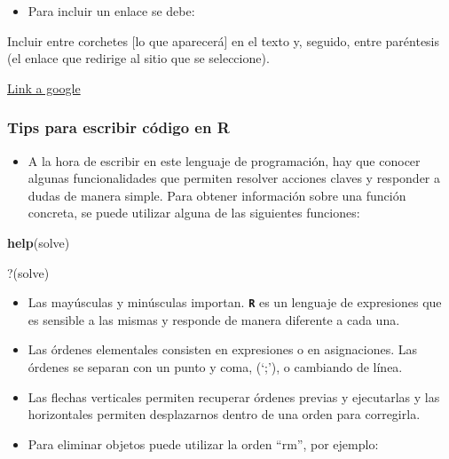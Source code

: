 \documentclass[
]{article}
\newenvironment{Shaded}{\begin{snugshade}}{\end{snugshade}}
\newcommand{\AttributeTok}[1]{\textcolor[rgb]{0.13,0.29,0.53}{#1}}
\newcommand{\FunctionTok}[1]{\textcolor[rgb]{0.13,0.29,0.53}{\textbf{#1}}}
\newcommand{\NormalTok}[1]{#1}
\newcommand{\StringTok}[1]{\textcolor[rgb]{0.31,0.60,0.02}{#1}}
\providecommand{\tightlist}{%
  \setlength{\itemsep}{0pt}\setlength{\parskip}{0pt}}
\begin{document}
\begin{itemize}
\tightlist
\item
  Para incluir un enlace se debe:
\end{itemize}

\begin{Shaded}
\begin{Highlighting}[]
\NormalTok{Incluir entre corchetes [lo que aparecerá] en el texto y, seguido, entre paréntesis (el enlace que redirige al sitio que se seleccione).}
\end{Highlighting}
\end{Shaded}

\href{www.google.com.ar}{Link a google}

\hypertarget{tips-para-escribir-cuxf3digo-en-r}{%
\subsubsection{Tips para escribir código en R}\label{tips-para-escribir-cuxf3digo-en-r}}

\begin{itemize}
\tightlist
\item
  A la hora de escribir en este lenguaje de programación, hay que conocer algunas funcionalidades que permiten resolver acciones claves y responder a dudas de manera simple. Para obtener información sobre una función concreta, se puede utilizar alguna de las siguientes funciones:
\end{itemize}

\begin{Shaded}
\begin{Highlighting}[]
\FunctionTok{help}\NormalTok{(solve)}
\end{Highlighting}
\end{Shaded}

\begin{Shaded}
\begin{Highlighting}[]
\StringTok{\textasciigrave{}}\AttributeTok{?}\StringTok{\textasciigrave{}}\NormalTok{(solve)}
\end{Highlighting}
\end{Shaded}

\begin{itemize}
\item
  Las mayúsculas y minúsculas importan. \textbf{\texttt{R}} es un lenguaje de expresiones que es sensible a las mismas y responde de manera diferente a cada una.
\item
  Las órdenes elementales consisten en expresiones o en asignaciones. Las órdenes se separan con un punto y coma, (`;'), o cambiando de línea.
\item
  Las flechas verticales permiten recuperar órdenes previas y ejecutarlas y las horizontales permiten desplazarnos dentro de una orden para corregirla.
\item
  Para eliminar objetos puede utilizar la orden ``rm'', por ejemplo:
\end{itemize}
\end{document}
